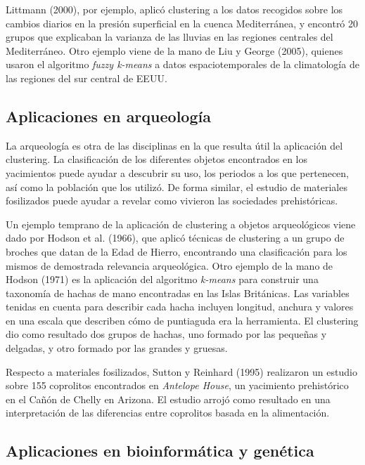 Littmann (2000), por ejemplo, aplicó clustering a los datos recogidos sobre los cambios diarios en la presión superficial en la cuenca Mediterránea, y encontró 20 grupos que explicaban la varianza de las lluvias en las regiones centrales del Mediterráneo. Otro ejemplo viene de la mano de Liu y George (2005), quienes usaron el algoritmo \textit{fuzzy k-means} a datos espaciotemporales de la climatología de las regiones del sur central de EEUU. 

\subsection{Aplicaciones en arqueología}

La arqueología es otra de las disciplinas en la que resulta útil la aplicación del clustering. La clasificación de los diferentes objetos encontrados en los yacimientos puede ayudar a descubrir su uso, los periodos a los que pertenecen, así como la población que los utilizó. De forma similar, el estudio de materiales fosilizados puede ayudar a revelar como vivieron las sociedades prehistóricas. 

Un ejemplo temprano de la aplicación de clustering a objetos arqueológicos viene dado por Hodson et al. (1966), que aplicó técnicas de clustering a un grupo de broches que datan de la Edad de Hierro, encontrando una clasificación para los mismos de demostrada relevancia arqueológica. Otro ejemplo de la mano de Hodson (1971) es la aplicación del algoritmo \textit{k-means} para construir una taxonomía de hachas de mano encontradas en las Islas Británicas. Las variables tenidas en cuenta para describir cada hacha incluyen longitud, anchura y valores en una escala que describen cómo de puntiaguda era la herramienta. El clustering dio como resultado dos grupos de hachas, uno formado por las pequeñas y delgadas, y otro formado por las grandes y gruesas.

Respecto a materiales fosilizados, Sutton y Reinhard (1995) realizaron un estudio sobre 155 coprolitos encontrados en \textit{Antelope House}, un yacimiento prehistórico en el Cañón de Chelly en Arizona. El estudio arrojó como resultado en una interpretación de las diferencias entre coprolitos basada en la alimentación.

\subsection{Aplicaciones en bioinformática y genética}

